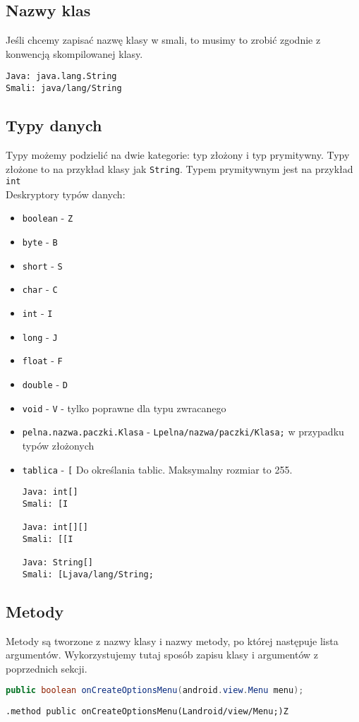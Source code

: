 \documentclass[12pt,a4paper,leqno,oneside,titlepage]{book}
\begin{document}
\subsection{Nazwy klas}
%
Jeśli chcemy zapisać nazwę klasy w smali, to musimy to zrobić zgodnie z konwencją skompilowanej klasy.
\begin{lstlisting}
Java: java.lang.String
Smali: java/lang/String
\end{lstlisting}
%
\subsection{Typy danych}
%
Typy możemy podzielić na dwie kategorie: typ złożony i typ prymitywny. Typy złożone to na przykład klasy jak \verb|String|. Typem prymitywnym jest na przykład \verb|int|\cite{DexFormat,SmaliTypes}\\
Deskryptory typów danych:
\begin{itemize}
\item \verb|boolean| - \verb|Z|
\item \verb|byte| - \verb|B|
\item \verb|short| - \verb|S|
\item \verb|char| - \verb|C|
\item \verb|int| - \verb|I|
\item \verb|long| - \verb|J|
\item \verb|float| - \verb|F|
\item \verb|double| - \verb|D|
\item \verb|void| - \verb|V| - tylko poprawne dla typu zwracanego
\item \verb|pelna.nazwa.paczki.Klasa| - \verb|Lpelna/nazwa/paczki/Klasa;| w przypadku typów złożonych
\item \verb|tablica| - \verb|[| Do określania tablic. Maksymalny rozmiar to 255.
\begin{lstlisting}
Java: int[]
Smali: [I

Java: int[][]
Smali: [[I

Java: String[]
Smali: [Ljava/lang/String;
\end{lstlisting}
%
\end{itemize} 
%
\subsection{Metody}
%
Metody są tworzone z nazwy klasy i nazwy metody, po której następuje lista argumentów. Wykorzystujemy tutaj sposób zapisu klasy i argumentów z poprzednich sekcji.
%
\begin{lstlisting}[language=Java,captionpos=b,caption={Java}]
public boolean onCreateOptionsMenu(android.view.Menu menu);
\end{lstlisting}
\begin{lstlisting}[language=smali,captionpos=b,caption={Smali}]
.method public onCreateOptionsMenu(Landroid/view/Menu;)Z
\end{lstlisting}
%
\end{document}

